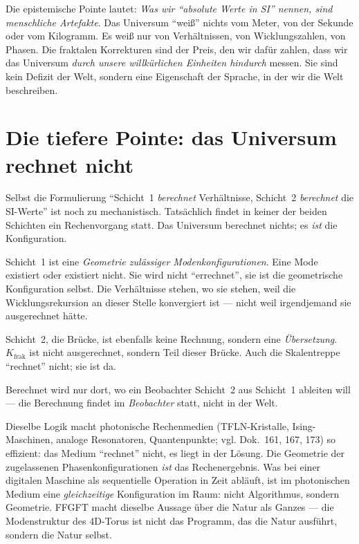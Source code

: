 Die epistemische Pointe lautet: \emph{Was wir ``absolute Werte in SI''
nennen, sind menschliche Artefakte}. Das Universum ``weiß'' nichts vom
Meter, von der Sekunde oder vom Kilogramm. Es weiß nur von Verhältnissen,
von Wicklungszahlen, von Phasen. Die fraktalen Korrekturen sind der Preis,
den wir dafür zahlen, dass wir das Universum \emph{durch unsere willkürlichen
Einheiten hindurch} messen. Sie sind kein Defizit der Welt, sondern eine
Eigenschaft der Sprache, in der wir die Welt beschreiben.

\section{Die tiefere Pointe: das Universum rechnet nicht}

Selbst die Formulierung ``Schicht~1 \emph{berechnet} Verhältnisse,
Schicht~2 \emph{berechnet} die SI-Werte'' ist noch zu mechanistisch.
Tatsächlich findet in keiner der beiden Schichten ein Rechenvorgang
statt. Das Universum berechnet nichts; es \emph{ist} die Konfiguration.

Schicht~1 ist eine \emph{Geometrie zulässiger Modenkonfigurationen}.
Eine Mode existiert oder existiert nicht. Sie wird nicht ``errechnet'',
sie ist die geometrische Konfiguration selbst. Die Verhältnisse stehen,
wo sie stehen, weil die Wicklungsrekursion an dieser Stelle konvergiert
ist --- nicht weil irgendjemand sie ausgerechnet hätte.

Schicht~2, die Brücke, ist ebenfalls keine Rechnung, sondern eine
\emph{Übersetzung}. $K_{\mathrm{frak}}$ ist nicht ausgerechnet, sondern
Teil dieser Brücke. Auch die Skalentreppe
``rechnet'' nicht; sie ist da.

Berechnet wird nur dort, wo ein Beobachter Schicht~2 aus Schicht~1
ableiten will --- die Berechnung findet im \emph{Beobachter} statt,
nicht in der Welt.

Dieselbe Logik macht photonische Rechenmedien (TFLN-Kristalle,
Ising-Maschinen, analoge Resonatoren, Quantenpunkte; vgl. Dok.~161,
167, 173) so effizient: das Medium ``rechnet'' nicht, es liegt in der
Lösung. Die Geometrie der zugelassenen Phasenkonfigurationen \emph{ist}
das Rechenergebnis. Was bei einer digitalen Maschine als sequentielle
Operation in Zeit abläuft, ist im photonischen Medium eine
\emph{gleichzeitige} Konfiguration im Raum: nicht Algorithmus, sondern
Geometrie. FFGFT macht dieselbe Aussage über die Natur als Ganzes ---
die Modenstruktur des 4D-Torus ist nicht das Programm, das die Natur
ausführt, sondern die Natur selbst.

